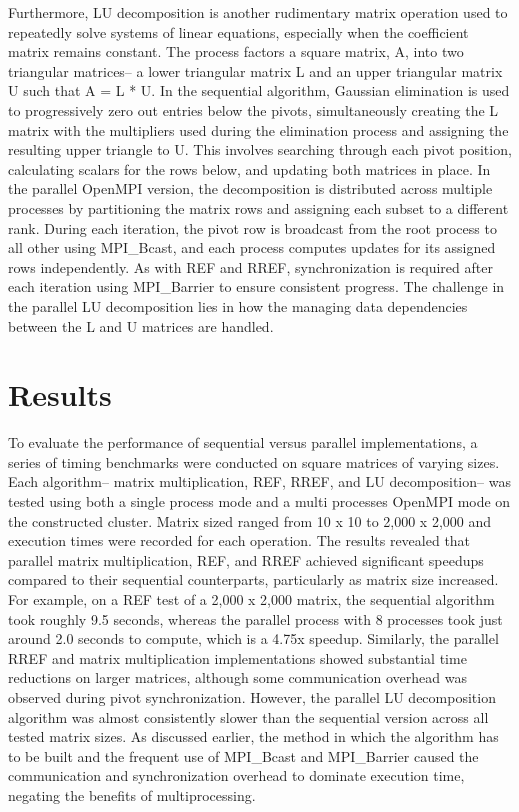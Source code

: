 \documentclass[12pt]{article}
\begin{document}
Furthermore, LU decomposition is another rudimentary matrix operation used to repeatedly solve systems of linear equations, especially when the coefficient matrix remains constant. The process factors a square matrix, A, into two triangular matrices-- a lower triangular matrix L and an upper triangular matrix U such that A = L * U. In the sequential algorithm, Gaussian elimination is used to progressively zero out entries below the pivots, simultaneously creating the L matrix with the multipliers used during the elimination process and assigning the resulting upper triangle to U. This involves searching through each pivot position, calculating scalars for the rows below, and updating both matrices in place. In the parallel OpenMPI version, the decomposition is distributed across multiple processes by partitioning the matrix rows and assigning each subset to a different rank. During each iteration, the pivot row is broadcast from the root process to all other using MPI_Bcast, and each process computes updates for its assigned rows independently. As with REF and RREF, synchronization is required after each iteration using MPI_Barrier to ensure consistent progress. The challenge in the parallel LU decomposition lies in how the managing data dependencies between the L and U matrices are handled. 

\section{Results}
To evaluate the performance of sequential versus parallel implementations, a series of timing benchmarks were conducted on square matrices of varying sizes. Each algorithm-- matrix multiplication, REF, RREF, and LU decomposition-- was tested using both a single process mode and a multi processes OpenMPI mode on the constructed cluster. Matrix sized ranged from 10 x 10 to 2,000 x 2,000 and execution times were recorded for each operation.
The results revealed that parallel matrix multiplication, REF, and RREF achieved significant speedups compared to their sequential counterparts, particularly as matrix size increased. For example, on a REF test of a 2,000 x 2,000 matrix, the sequential algorithm took roughly 9.5 seconds, whereas the parallel process with 8 processes took just around 2.0 seconds to compute, which is a 4.75x speedup. Similarly, the parallel RREF and matrix multiplication implementations showed substantial time reductions on larger matrices, although some communication overhead was observed during pivot synchronization.
However, the parallel LU decomposition algorithm was almost consistently slower than the sequential version across all tested matrix sizes. As discussed earlier, the method in which the algorithm has to be built and the frequent use of MPI_Bcast and MPI_Barrier caused the communication and synchronization overhead to dominate execution time, negating the benefits of multiprocessing. 
\end{document}
